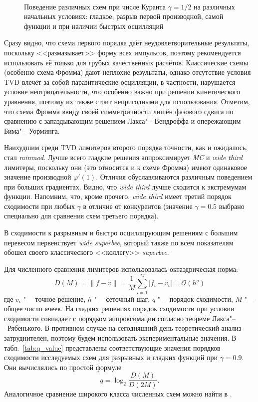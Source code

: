 \begin{figure}
	\\
	\caption{Поведение различных схем при числе Куранта \(\gamma=1/2\) на различных начальных условиях:
		гладкое, разрыв первой производной, самой функции и при наличии быстрых осцилляций}\label{fig:conver}
\end{figure}

Сразу видно, что схема первого порядка даёт неудовлетворительные результаты, поскольку <<размазывает>> форму всех импульсов,
поэтому рекомендуется использовать её только для грубых качественных расчётов.
Классические схемы (особенно схема Фромма) дают неплохие результаты, однако отсутствие условия TVD влечёт за собой паразитические осцилляции,
в частности, нарушается условие неотрицательности, что особенно важно при решении кинетического уравнения,
поэтому их также стоит непригодными для использования. Отметим, что схема Фромма ввиду своей симметричности лишён фазового сдвига
по сравнению с запаздывающим решением Лакса"--~Вендроффа и опережающим Бима"--~Уорминга.

Наихудшим среди TVD лимитеров второго порядка точности, как и ожидалось, стал \textit{minmod}.
Лучше всего гладкие решения аппроксимирует \textit{MC} и \textit{wide third} лимитеры,
поскольку они (это относится и к схеме Фромма) имеют одинаковое значение производной \(\varphi'(1)\).
Отличия обуславливаются различным поведением при больших градиентах.
Видно, что \textit{wide third} лучше сходится к экстремумам функции.
Напомним, что, кроме прочего, \textit{wide third} имеет третий порядок сходимости при любых \(\gamma\) в отличие от конкурентов
(значение \(\gamma=0.5\) выбрано специально для сравнения схем третьего порядка).

В сходимости к разрывным и быстро осциллирующим решениям с большим перевесом первенствует \textit{wide superbee},
который также по всем показателям обошел своего классического <<коллегу>> \textit{superbee}.

Для численного сравнения лимитеров использовалась октаэдрическая норма:
\begin{equation}\label{eq:octahedron}
	D(M) = \|f-v\| = \frac1{M}\sum_{i=1}^{M}|f_i-v_i| = \mathcal{O}(h^q)
\end{equation}
где \(v_i\) "--- точное решение, \(h\) "--- сеточный шаг, \(q\) "--- порядок сходимости, \(M\) "--- общее число ячеек.
На гладких решениях порядок сходимости при условии сходимости совпадает с порядком аппроксимации согласно теореме Лакса"--~Рябенького.
В противном случае на сегодняшний день теоретический анализ затруднителен, поэтому будем использовать экспериментальные значения.
В табл.~\ref{tab:q_value} представлены соответствующие значения порядков сходимости исследуемых схем 
для разрывных и гладких функций при \(\gamma=0.9\). Они вычислялись по простой формуле
\[ q = \log_2\frac{D(M)}{D(2M)}. \]
Аналогичное сравнение широкого класса численных схем можно найти в \cite{Safronov2010}.

